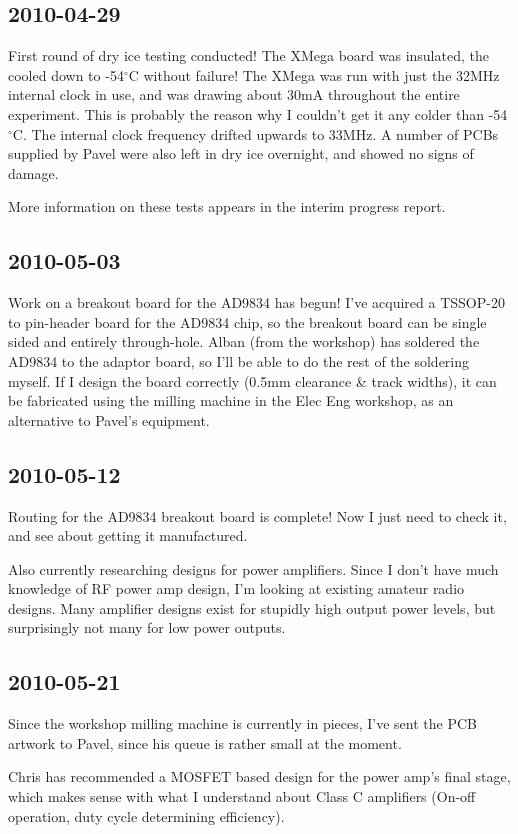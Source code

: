 \documentclass[a4paper,10pt]{article}
\begin{document}
\subsection{2010-04-29}
First round of dry ice testing conducted! The XMega board was insulated, the cooled down to -54$^\circ$C without failure! The XMega was run with just the 32MHz internal clock in use, and was drawing about 30mA throughout the entire experiment. This is probably the reason why I couldn't get it any colder than -54$^\circ$C. The internal clock frequency drifted upwards to 33MHz.
A number of PCBs supplied by Pavel were also left in dry ice overnight, and showed no signs of damage.

More information on these tests appears in the interim progress report.

\subsection{2010-05-03}
Work on a breakout board for the AD9834 has begun! I've acquired a TSSOP-20 to pin-header board for the AD9834 chip, so the breakout board can be single sided and entirely through-hole. Alban (from the workshop) has soldered the AD9834 to the adaptor board, so I'll be able to do the rest of the soldering myself. If I design the board correctly (0.5mm clearance \& track widths), it can be fabricated using the milling machine in the Elec Eng workshop, as an alternative to Pavel's equipment. 

\subsection{2010-05-12}
Routing for the AD9834 breakout board is complete! Now I just need to check it, and see about getting it manufactured.

Also currently researching designs for power amplifiers. Since I don't have much knowledge of RF power amp design, I'm looking at existing amateur radio designs. Many amplifier designs exist for stupidly high output power levels, but surprisingly not many for low power outputs.

\subsection{2010-05-21}
Since the workshop milling machine is currently in pieces, I've sent the PCB artwork to Pavel, since his queue is rather small at the moment.

Chris has recommended a MOSFET based design for the power amp's final stage, which makes sense with what I understand about Class C amplifiers (On-off operation, duty cycle determining efficiency). 
\end{document}
